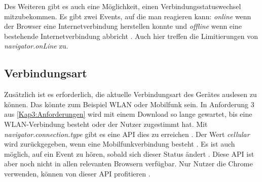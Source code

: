 Des Weiteren gibt es auch eine Möglichkeit, einen Verbindungsstatuswechsel mitzubekommen. Es gibt zwei Events, auf die man reagieren kann: \emph{online} wenn der Browser eine Internetverbindung herstellen konnte und \emph{offline} wenn eine bestehende Internetverbindung abbricht \autocite{mdn-online}. Auch hier treffen die Limitierungen von \emph{navigator.onLine} zu.

\subsection{Verbindungsart}
Zusätzlich ist es erforderlich, die aktuelle Verbindungsart des Gerätes auslesen zu können. Das könnte zum Beispiel WLAN oder Mobilfunk sein. In Anforderung 3 aus \autoref{Kap3:Anforderungen} wird mit einem Download so lange gewartet, bis eine WLAN-Verbindung besteht oder der Nutzer zugestimmt hat. Mit \emph{navigator.connection.type} gibt es eine \ac{API} dies zu erreichen \autocite{network-type-mdn}. Der Wert \textit{cellular} wird zurückgegeben, wenn eine Mobilfunkverbindung besteht \autocite{network-type-mdn}. Es ist auch möglich, auf ein Event zu hören, sobald sich dieser Status ändert \autocite{network-information-mdn}. Diese \ac{API} ist aber noch nicht in allen relevanten Browsern verfügbar. Nur Nutzer die Chrome verwenden, können von dieser \ac{API} profitieren \autocite{network-type-mdn}.
